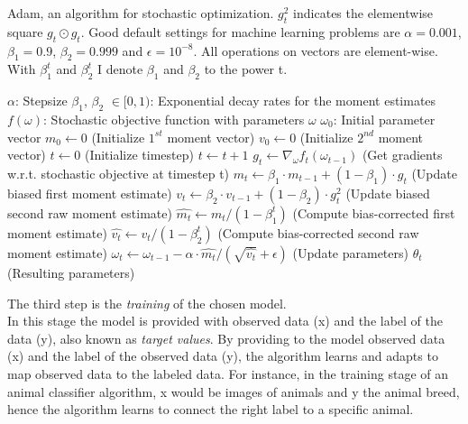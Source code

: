 \begin{algorithm}
    \caption{Adam, an algorithm for stochastic optimization. $g_t^2$ indicates the elementwise
    square $g_t \odot g_t$. Good default settings for machine learning problems are $\alpha = 0.001$,
    $\beta_1 = 0.9$, $\beta_2 = 0.999$ and $\epsilon = 10^{-8}$. All operations on vectors are element-wise. With $\beta_1^t$ and $\beta_2^t$
    I denote $\beta_1$ and $\beta_2$ to the power t.}
    \label{alg:adam}
    \begin{algorithmic}
    \Require $\alpha$: Stepsize
    \Require $\beta_1$, $\beta_2$ $\in [0, 1)$: Exponential decay rates for the moment estimates
    \Require $f(\omega)$: Stochastic objective function with parameters $\omega$
    \Require $\omega_0$: Initial parameter vector
    \State $m_0 \gets 0$ (Initialize $1^{st}$ moment vector)
    \State $v_0 \gets 0$ (Initialize $2^{nd}$ moment vector)
    \State $t \gets 0$ (Initialize timestep)
    \State $t \gets t + 1$
    \State $g_t \gets \nabla_{\omega} f_t(\omega_{t-1}) $ (Get gradients w.r.t. stochastic objective at timestep t)
    \State $m_t \gets \beta_1 \cdot m_{t-1} + (1 - \beta_1) \cdot g_t$ (Update biased first moment estimate)
    \State $v_t \gets \beta_2 \cdot v_{t-1} + (1 - \beta_2) \cdot g_t^2$ (Update biased second raw moment estimate)
    \State $\hat{m_t} \gets m_t / (1 - \beta^t_1)$ (Compute bias-corrected first moment estimate)
    \State $\hat{v_t} \gets v_t / (1 - \beta^t_2)$ (Compute bias-corrected second raw moment estimate)
    \State $\omega_t \gets \omega_{t-1} - \alpha \cdot \hat{m_t} / (\sqrt{\hat{v_t}} + \epsilon)$ (Update parameters)
    \EndWhile
    \State \Return $\theta_t$ (Resulting parameters)
\end{algorithmic}
\label{work:adam}
\end{algorithm}

The third step is the \textit{training} of the chosen model.\\
In this stage the model is provided with observed data (x) and the label of the data (y), also known as \textit{target values}.
By providing to the model observed data (x) and the label of the observed data (y), the algorithm learns and adapts to map observed data to the labeled data.
For instance, in the training stage of an animal classifier algorithm, x would be images of animals and y the animal breed, hence the algorithm 
learns to connect the right label to a specific animal.\\

